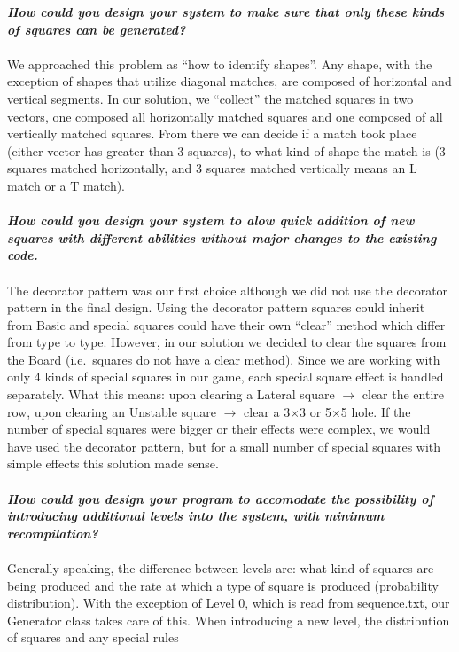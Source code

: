 \documentclass{report}
\begin{document}
\textbf{\textit{How could you design your system to make sure that only these kinds of squares can be generated?}}\\
\\
We approached this problem as ``how to identify shapes''.
Any shape, with the exception of shapes that utilize diagonal matches,
are composed of horizontal and vertical segments. In our solution, we ``collect''
the matched squares in two vectors, one composed all horizontally matched squares
and one composed of all vertically matched squares. From there we can decide if
a match took place (either vector has greater than 3 squares), to what kind of shape
the match is (3 squares matched horizontally, and 3 squares matched vertically means
an L match or a T match).\\
\\
\textbf{\textit{How could you design your system to alow quick addition of new squares with different abilities without major changes to the existing code.}}\\
\\
The decorator pattern was our first choice although we did not use the decorator pattern
in the final design. Using the decorator pattern squares could inherit from Basic
and special squares could have their own ``clear'' method which differ from type to type.
However, in our solution we decided to clear the squares from the Board (i.e.\ squares do not
have a clear method). Since we are working with only 4 kinds of special squares in our game,
each special square effect is handled separately. What this means: upon clearing a Lateral
square $\rightarrow$ clear the entire row, upon clearing an Unstable square $\rightarrow$
clear a 3$\times$3 or 5$\times$5 hole. If the number of special squares were bigger or their
effects were complex, we would have used the decorator pattern, but for a small
number of special squares with simple effects this solution made sense.\\
\\
\textbf{\textit{How could you design your program to accomodate the possibility of introducing additional levels into the system, with minimum recompilation?}}\\
\\
Generally speaking, the difference between levels are: what kind of squares are being
produced and the rate at which a type of square is produced (probability distribution).
With the exception of Level 0, which is read from sequence.txt, our Generator class takes
care of this. When introducing a new level, the distribution of squares and any special rules
\end{document}
